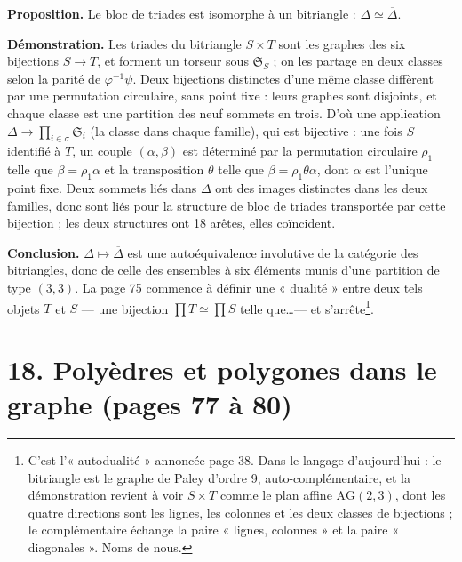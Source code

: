 \documentclass[11pt,a4paper]{article}
\begin{document}
\textbf{Proposition.} Le bloc de triades est isomorphe à un bitriangle :
$\Delta \simeq \overline\Delta$.

\textbf{Démonstration.} Les triades du bitriangle $S \times T$ sont les
graphes des six bijections $S \to T$, et forment un torseur sous
$\mathfrak{S}_S$ ; on les partage en deux classes selon la parité de
$\varphi^{-1}\psi$. Deux bijections distinctes d'une même classe diffèrent par
une permutation circulaire, sans point fixe : leurs graphes sont disjoints, et
chaque classe est une partition des neuf sommets en trois. D'où une
application $\Delta \to \prod_{i \in \sigma} \mathfrak{S}_i$ (la classe dans
chaque famille), qui est bijective : une fois $S$ identifié à $T$, un couple
$(\alpha, \beta)$ est déterminé par la permutation circulaire $\rho_1$ telle
que $\beta = \rho_1 \alpha$ et la transposition $\theta$ telle que $\beta =
\rho_1 \theta\alpha$, dont $\alpha$ est l'unique point fixe. Deux sommets liés
dans $\Delta$ ont des images distinctes dans les deux familles, donc sont liés
pour la structure de bloc de triades transportée par cette bijection ; les
deux structures ont 18 arêtes, elles coïncident.

\textbf{Conclusion.} $\Delta \mapsto \overline\Delta$ est une autoéquivalence
involutive de la catégorie des bitriangles, donc de celle des ensembles à six
éléments munis d'une partition de type $(3, 3)$. La page 75 commence à définir
une « dualité » entre deux tels objets $T$ et $S$ --- une bijection $\prod T
\simeq \prod S$ telle que\ldots --- et s'arrête\footnote{C'est
l'« autodualité » annoncée page 38. Dans le langage d'aujourd'hui : le
bitriangle est le graphe de Paley d'ordre 9, auto-complémentaire, et la
démonstration revient à voir $S \times T$ comme le plan affine
$\mathrm{AG}(2, 3)$, dont les quatre directions sont les lignes, les colonnes
et les deux classes de bijections ; le complémentaire échange la paire
« lignes, colonnes » et la paire « diagonales ». Noms de nous.}.

\section*{18. Polyèdres et polygones dans le graphe (pages 77 à 80)}
\end{document}
